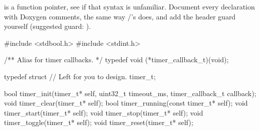  is a function pointer, see  if that syntax is unfamiliar.
Document every declaration with Doxygen comments, the same way
/'s  does, and add the header guard yourself (suggested
guard: ).

\begin{ccode}
#include <stdbool.h>
#include <stdint.h>

/** Alias for timer callbacks. */
typedef void (*timer_callback_t)(void);

typedef struct
{
    // Left for you to design.
} timer_t;

bool timer_init(timer_t* self, uint32_t timeout_ms, timer_callback_t callback);
void timer_clear(timer_t* self);
bool timer_running(const timer_t* self);
void timer_start(timer_t* self);
void timer_stop(timer_t* self);
void timer_toggle(timer_t* self);
void timer_reset(timer_t* self);
\end{ccode}

